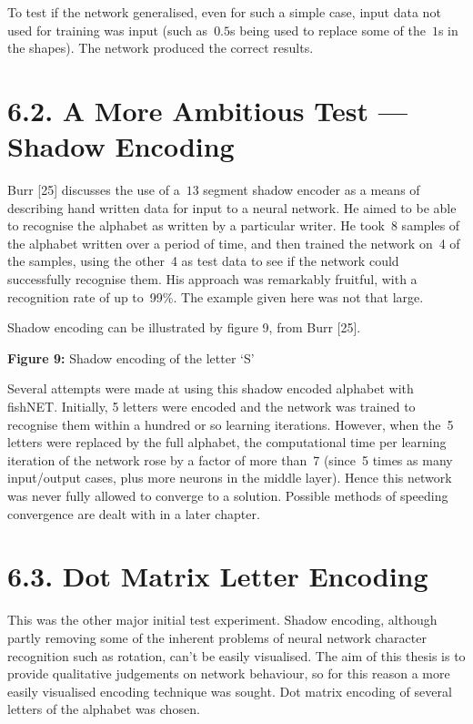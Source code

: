\documentclass[12pt]{report}
\begin{document}
To test if the network generalised, even for such a simple
case, input data not used for training was input (such as~$0.5$s
being used to replace some of the~$1$s in the shapes).
The network produced the correct results.

\section{6.2. A More Ambitious Test --- Shadow Encoding}

Burr [25] discusses the use of a~$13$ segment shadow encoder as a
means of describing hand written data for input to a neural network.
He aimed to be able to recognise the alphabet as written by a
particular writer.
He took~$8$ samples of the alphabet written over a period of time,
and then trained the network on~4 of the samples, using the other~4
as test data to see if the network could successfully recognise
them.
His approach was remarkably fruitful, with a recognition rate of up
to~99\%.
The example given here was not that large.

Shadow encoding can be illustrated by figure 9,
from Burr [25].
\par\textbf{Figure 9:} Shadow encoding of the letter `S'

Several attempts were made at using this shadow encoded alphabet
with fishNET.
Initially, 5 letters were encoded and the network was trained to
recognise them within a hundred or so learning iterations.
However, when the~5 letters were replaced by the full alphabet, the
computational time per learning iteration of the network rose by a factor
of more than~7 (since~5 times as many input/output cases, plus more
neurons in the middle layer).
Hence this network was never fully allowed to converge to a
solution.
Possible methods of speeding convergence are dealt with in a later
chapter.

\section{6.3. Dot Matrix Letter Encoding}

This was the other major initial test experiment.
Shadow encoding, although partly removing some of the inherent problems of
neural network character recognition such as rotation, can't be easily
visualised.
The aim of this thesis is to provide qualitative judgements on
network behaviour, so for this reason a more easily visualised
encoding technique was sought.
Dot matrix encoding of several letters of the alphabet was chosen.
\end{document}
